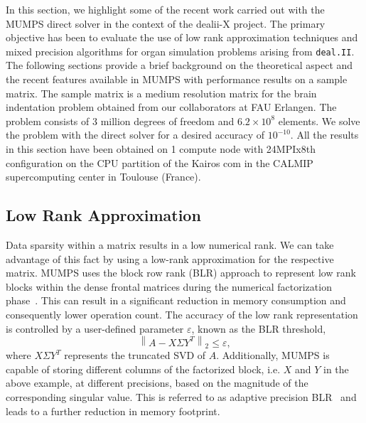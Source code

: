 \documentclass[a4paper,12pt]{article}
\begin{document}
In this section, we highlight some of the recent work carried out with
the MUMPS direct solver in the context of the dealii-X project. The
primary objective has been to evaluate the use of low rank
approximation techniques and mixed precision algorithms for organ
simulation problems arising from \texttt{deal.II}. The following
sections provide a brief background on the theoretical aspect and the
recent features available in MUMPS with performance results on a
sample matrix. The sample matrix is a medium resolution matrix for the
brain indentation problem obtained from our collaborators at FAU
Erlangen. The problem consists of 3 million degrees of freedom and
$6.2\times 10^8$ elements. We solve the problem with the direct solver
for a desired accuracy of $10^{-10}$. All the results in this section
have been obtained on 1 compute node with 24MPIx8th configuration on
the CPU partition of the Kairos com in the CALMIP supercomputing
center in Toulouse (France).

\subsection{Low Rank Approximation}
Data sparsity within a matrix results in a low numerical rank. We can
take advantage of this fact by using a low-rank approximation for the
respective matrix. MUMPS uses the block row rank (BLR) approach to
represent low rank blocks within the dense frontal matrices during the
numerical factorization phase~\cite{a.b.h.l.:22,a.b.l.m:17}. This can
result in a significant reduction in memory consumption and
consequently lower operation count. The accuracy of the low rank
representation is controlled by a user-defined parameter
$\varepsilon$, known as the BLR threshold,
\begin{equation}\label{BLR_error}
    \left\lVert A-X\Sigma Y^T\right\rVert_2 \leq \varepsilon,
\end{equation}
where $X\Sigma Y^T$ represents the truncated SVD of $A$.
Additionally, MUMPS is capable of storing different columns of the
factorized block, i.e. $X$ and $Y$ in the above example, at different
precisions, based on the magnitude of the corresponding singular
value. This is referred to as adaptive precision BLR~\cite{a.b.b.g:22}
and leads to a further reduction in memory footprint.
\end{document}
